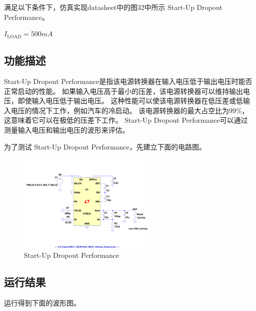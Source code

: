 \documentclass[lang=cn,10pt]{elegantbook}
\begin{document}
满足以下条件下，仿真实现datasheet中的图32中所示 Start-Up Dropout Performance。

$I_{\text{LOAD}} = 500mA$

\subsection{功能描述}


Start-Up Dropout Performance是指该电源转换器在输入电压低于输出电压时能否正常启动的性能。
如果输入电压高于最小的压差，该电源转换器可以维持输出电压，即使输入电压低于输出电压。
这种性能可以使该电源转换器在低压差或低输入电压的情况下工作，例如汽车的冷启动。
该电源转换器的最大占空比为99\%，这意味着它可以在极低的压差下工作。
Start-Up Dropout Performance可以通过测量输入电压和输出电压的波形来评估。

为了测试 Start-Up Dropout Performance，先建立下面的电路图。

\begin{figure}[!htb]
    \centering\includegraphics[page=1, width=0.6\textwidth]{figure/6_lt8631_StartUp_Dropout_asc.pdf}
    \caption{Start-Up Dropout Performance}
\end{figure}

\subsection{运行结果}

运行得到下面的波形图。
\end{document}
